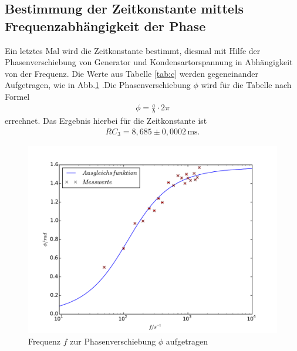 \subsection{Bestimmung der Zeitkonstante mittels Frequenzabhängigkeit der Phase}
Ein letztes Mal wird die Zeitkonstante bestimmt, diesmal mit Hilfe der Phasenverschiebung von Generator und Kondensartorspannung in Abhängigkeit von der Frequenz.
Die Werte aus Tabelle \ref{tab:c} werden gegeneinander Aufgetragen, wie in Abb.\ref{abb:c} .Die Phasenverschiebung $\phi$ wird für
die Tabelle nach Formel
\begin{align}
\phi=\frac{a}{b}\cdot2\pi
\end{align}
errechnet.
Das Ergebnis hierbei für die Zeitkonstante ist
\begin{align*}
  RC_\mathrm{3}=8,685\pm0,0002\,\si{\milli\second}.
\end{align*}
\begin{figure}[h]
  \centering
  \includegraphics[width=1\textwidth]{c.pdf}
  \caption{Frequenz $f$ zur Phasenverschiebung $\phi$ aufgetragen}
  \label{abb:c}
\end{figure}
